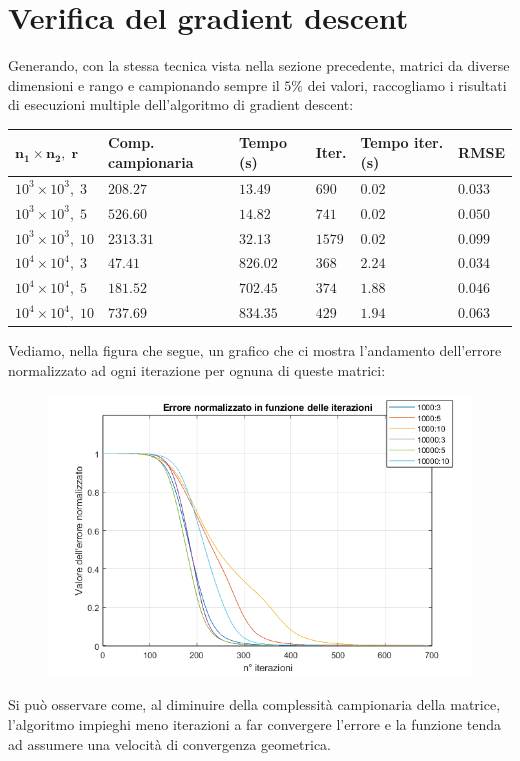 \documentclass[12pt,a4paper]{report}
\begin{document}
\section{Verifica del gradient descent}

Generando, con la stessa tecnica vista nella sezione precedente,
matrici da diverse dimensioni e rango
e campionando sempre il $5\%$ dei valori, raccogliamo i risultati
di esecuzioni multiple dell'algoritmo di gradient descent:
\begin{table}[H]
  \centering
  \begin{tabular}{@{}llllll@{}}
  \toprule
  \textbf{$\boldsymbol{n_1 \times n_2, \; r}$} & \textbf{Comp. campionaria} & \textbf{Tempo (s)} & \textbf{Iter.} & \textbf{Tempo iter. (s)} & \textbf{RMSE} \\ \midrule
  $10^3 \times 10^3, \; 3$  & $208.27$  & $13.49$   & $690$     & $0.02$     & $0.033$     \\ \midrule
  $10^3 \times 10^3, \; 5$  & $526.60$  & $14.82$   & $741$     & $0.02$     & $0.050$     \\ \midrule
  $10^3 \times 10^3, \; 10$ & $2313.31$ & $32.13$   & $1579$    & $0.02$     & $0.099$     \\ \midrule
  $10^4 \times 10^4, \; 3$  & $47.41$   & $826.02$  & $368$     & $2.24$     & $0.034$     \\ \midrule
  $10^4 \times 10^4, \; 5$  & $181.52$  & $702.45$  & $374$     & $1.88$     & $0.046$     \\ \midrule
  $10^4 \times 10^4, \; 10$ & $737.69$  & $834.35$  & $429$     & $1.94$     & $0.063$     \\ \bottomrule
  \end{tabular}
\end{table}

Vediamo, nella figura che segue, un grafico che ci mostra l'andamento dell'errore normalizzato
ad ogni iterazione per ognuna di queste matrici:
\begin{figure}[H]
  \centering
  \includegraphics[width=.75\textwidth]{Figures/errors}
\end{figure}
Si può osservare come, al diminuire della complessità campionaria della matrice,
l'algoritmo impieghi meno iterazioni a far convergere l'errore e la funzione
tenda ad assumere una velocità di convergenza geometrica.
\end{document}
